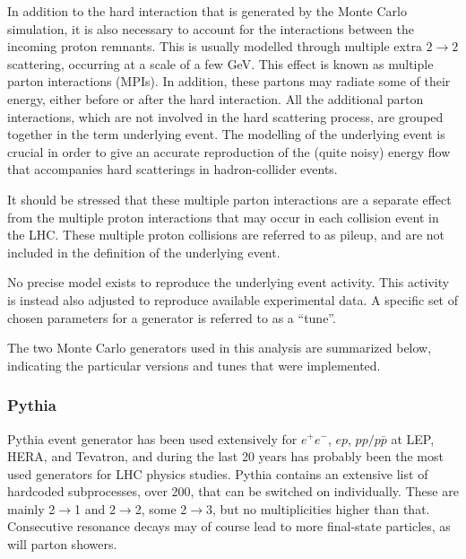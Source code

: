 In addition to the hard interaction that is generated by the Monte Carlo
simulation, it is also necessary to account for the interactions between the incoming proton  remnants. This is usually modelled through multiple extra $2\rightarrow 2$ scattering, occurring at a scale of a few GeV. This effect is known as multiple parton interactions (MPIs). In addition, these partons may radiate some of their energy, either before or after the hard interaction.  All the additional parton interactions, which are not involved in the hard scattering process, are grouped together in the term underlying event. The modelling of the underlying event is crucial in order to give an accurate reproduction of the (quite noisy) energy flow that accompanies hard scatterings in hadron-collider events.

It should be stressed that these multiple parton interactions are a separate effect from the multiple proton interactions that may occur in each collision event in the LHC. These multiple proton collisions are referred to as pileup, and are not included in the definition of the underlying event. 

No precise model exists to reproduce the underlying event activity. This activity is instead also adjusted to reproduce available experimental data. A specific set of chosen parameters for a generator is referred to as a ``tune''.  

The two Monte Carlo generators used in this analysis are summarized below, indicating the particular versions and tunes that were implemented.


\subsubsection{Pythia}

{\sc Pythia} event generator has been used extensively for $e^+ e^-$, $ep$, $pp/p\bar{p}$ at LEP, HERA, and Tevatron, and during the last 20 years has probably been the most used generators for LHC physics studies.  {\sc Pythia} contains an extensive list of hardcoded subprocesses, over 200, that can be switched on individually. These are mainly 2$\rightarrow$1 and  2$\rightarrow$2, some  2$\rightarrow$3, but no multiplicities higher than that. Consecutive resonance decays may of course lead to more final-state particles, as will parton showers.

